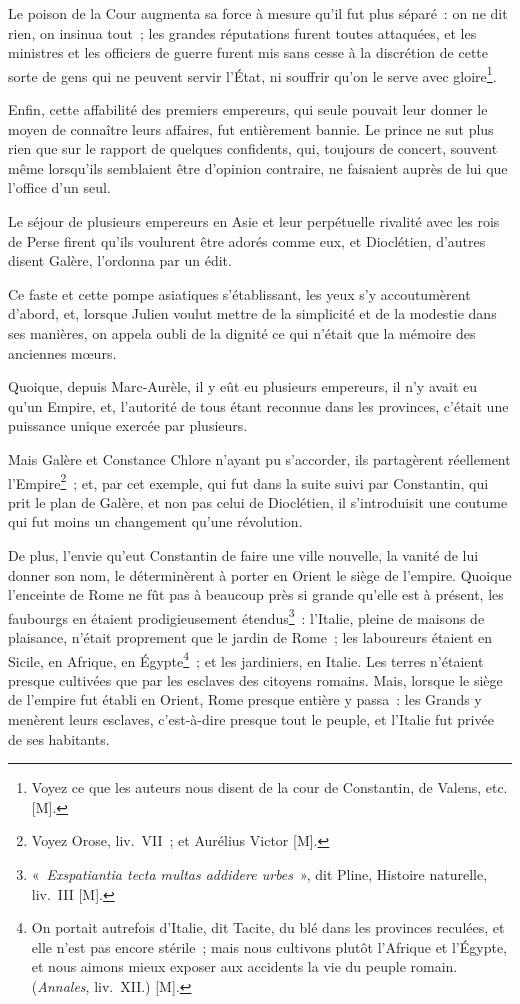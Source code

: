 \documentclass[french,twoside]{book} %
\begin{document}
Le poison de la Cour augmenta sa force à mesure qu’il fut plus séparé : on ne dit rien, on insinua tout ; les grandes réputations furent toutes attaquées, et les ministres et les officiers de guerre furent mis sans cesse à la discrétion de cette sorte de gens qui ne peuvent servir l’État, ni souffrir qu’on le serve avec gloire\footnote{Voyez ce que les auteurs nous disent de la cour de Constantin, de Valens, etc. [M].}.\par
Enfin, cette affabilité des premiers empereurs, qui seule pouvait leur donner le moyen de connaître leurs affaires, fut entièrement bannie. Le prince ne sut plus rien que sur le rapport de quelques confidents, qui, toujours de concert, souvent même lorsqu’ils semblaient être d’opinion contraire, ne faisaient auprès de lui que l’office d’un seul.\par
Le séjour de plusieurs empereurs en Asie et leur perpétuelle rivalité avec les rois de Perse firent qu’ils voulurent être adorés comme eux, et Dioclétien, d’autres disent Galère, l’ordonna par un édit.\par
Ce faste et cette pompe asiatiques s’établissant, les yeux s’y accoutumèrent d’abord, et, lorsque Julien voulut mettre de la simplicité et de la modestie dans ses manières, on appela oubli de la dignité ce qui n’était que la mémoire des anciennes mœurs.\par
Quoique, depuis Marc-Aurèle, il y eût eu plusieurs empereurs, il n’y avait eu qu’un Empire, et, l’autorité de tous étant reconnue dans les provinces, c’était une puissance unique exercée par plusieurs.\par
Mais Galère et Constance Chlore n’ayant pu s’accorder, ils partagèrent réellement l’Empire\footnote{Voyez Orose, liv. VII ; et Aurélius Victor [M].} ; et, par cet exemple, qui fut dans la suite suivi par Constantin, qui prit le plan de Galère, et non pas celui de Dioclétien, il s’introduisit une coutume qui fut moins un changement qu’une révolution.\par
De plus, l’envie qu’eut Constantin de faire une ville nouvelle, la vanité de lui donner son nom, le déterminèrent à porter en Orient le siège de l’empire. Quoique l’enceinte de Rome ne fût pas à beaucoup près si grande qu’elle est à présent, les faubourgs en étaient prodigieusement étendus\footnote{« {\itshape Exspatiantia tecta multas addidere urbes} », dit Pline, Histoire naturelle, liv. III [M].} : l’Italie, pleine de maisons de plaisance, n’était proprement que le jardin de Rome ; les laboureurs étaient en Sicile, en Afrique, en Égypte\footnote{On portait autrefois d’Italie, dit Tacite, du blé dans les provinces reculées, et elle n’est pas encore stérile ; mais nous cultivons plutôt l’Afrique et l’Égypte, et nous aimons mieux exposer aux accidents la vie du peuple romain. ({\itshape Annales}, liv. XII.) [M].} ; et les jardiniers, en Italie. Les terres n’étaient presque cultivées que par les esclaves des citoyens romains. Mais, lorsque le siège de l’empire fut établi en Orient, Rome presque entière y passa : les Grands y menèrent leurs esclaves, c’est-à-dire presque tout le peuple, et l’Italie fut privée de ses habitants.\par
\end{document}
